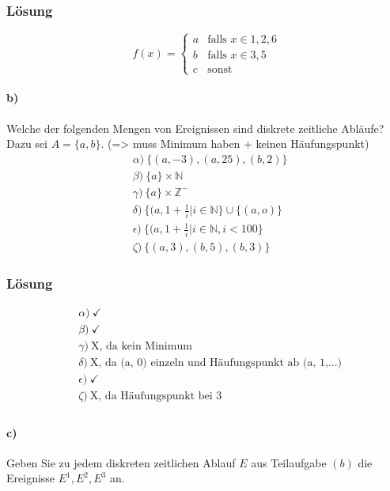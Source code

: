 \documentclass[a4paper]{scrartcl}
\begin{document}
\subsubsection*{Lösung}
\begin{equation*}
\ f(x) = 
\begin{cases}
a & \text{falls } x \in {1, 2, 6}\\
b & \text{falls } x \in {3, 5}\\
c & \text{sonst}
\end{cases}
\end{equation*}

\paragraph{b)} Welche der folgenden Mengen von Ereignissen sind diskrete zeitliche Abläufe? Dazu sei $ A = \{a, b\} $.  
(=> muss Minimum haben + keinen Häufungspunkt)
\begin{align*}
& \alpha) \ \{ (a, -3), (a, 25), (b, 2) \} \\
& \beta) \ \{ a \} \times \mathbb{N} \\
& \gamma) \ \{ a \} \times \mathbb{Z}^- \\
& \delta) \ \{ (a, 1+ \frac{1}{i} | i \in \mathbb{N} \} \cup \{ (a, o ) \} \\
& \epsilon) \ \{ (a, 1+ \frac{1}{i} | i \in \mathbb{N} , i < 100 \} \\
& \zeta) \ \{ (a, 3), (b, 5), (b, 3) \}
\end{align*}
 
\subsubsection*{Lösung}
\begin{align*}
& \alpha) \ \checkmark \\
& \beta) \ \checkmark\\
& \gamma) \ \text{X} \text{, da kein Minimum} \\
& \delta) \ \text{X} \text{, da (a, 0) einzeln und Häufungspunkt ab (a, 1,...)} \\
& \epsilon) \ \checkmark \\
& \zeta) \ \text{X} \text{, da Häufungspunkt bei 3} \\
\end{align*}

\paragraph{c)} Geben Sie zu jedem diskreten zeitlichen Ablauf $ E $ aus Teilaufgabe $ (b) $ die Ereignisse $E^1, E^2, E^3 $ an.
\end{document}
